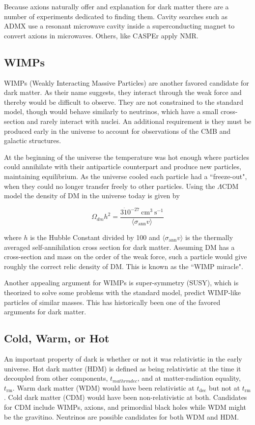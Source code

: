 Because axions naturally offer and explanation for dark matter there are a number of experiments dedicated to
finding them.  Cavity searches such as ADMX use a resonant microwave cavity inside a superconducting magnet
to convert axions in microwaves.  Others, like CASPEr apply NMR.


\subsection{WIMPs} \label{subsec:wimps}
WIMPs (Weakly Interacting Massive Particles) are another favored candidate for dark matter.  As their name
suggests, they interact through the weak force and thereby would be difficult to observe.  They
are not constrained to the standard model, though would behave similarly
to neutrinos, which have a small cross-section and rarely interact with nuclei.  An additional requirement
is they must be produced early in the universe to account for observations of the CMB and galactic
structures.

At the beginning of the universe the temperature was hot enough where particles could annihilate with their
antiparticle counterpart and produce new particles, maintaining equilibrium.  As the universe cooled each
particle had a ``freeze-out", when they could no longer transfer freely to other particles.  Using the
$\Lambda$CDM model the density of DM in the universe today is given by

\begin{equation}
\Omega_{dm}h^{2} = \frac{3 \dot 10^{-27}\ \mathrm{cm^{3}\ s^{-1}}}{\langle \sigma_{\mathrm{ann}} v \rangle}
\end{equation}

\noindent where $h$ is the Hubble Constant divided by 100 and $\langle \sigma_{\mathrm{ann}} v \rangle$ is
the thermally averaged self-annihilation cross section
for dark matter.  Assuming DM has a cross-section and mass on the order of the weak force, such a
particle would give roughly the correct relic density of DM.  This is known as the ``WIMP miracle".

Another appealing argument for WIMPs is super-symmetry (SUSY), which is theorized to solve some problems
with the standard model,
predict WIMP-like particles of similar masses.  This has historically been one of the favored arguments
for dark matter.

\subsection{Cold, Warm, or Hot} \label{subsec:hot_vs_cold}
An important property of dark is whether or not it was relativistic in the early universe.  Hot dark matter (HDM)
is defined as being relativistic at the time it decoupled from other components, $t_{mathrm{dec}}$, and at
matter-radiation equality, $t_{\mathrm{rm}}$.  Warm dark matter (WDM) would have been relativistic at $t_{\mathrm{dec}}$
but not at $t_{\mathrm{rm}}$.  Cold dark matter (CDM) would have been non-relativistic at both.  Candidates for CDM include
WIMPs, axions, and primordial black holes while WDM might be the gravitino.  Neutrinos are possible candidates for both
WDM and HDM.

